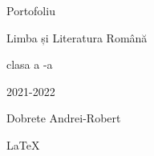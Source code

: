 \documentclass[
12pt,
a4paper
]{article}
\author{} %
\newcommand{\rom}[1]{\uppercase\expandafter{\romannumeral #1\relax}} %
\begin{document}
\begin{center}
 \vspace{9cm}
 {\LARGE Portofoliu}

 \vspace{0.5cm}
 {\Huge Limba și Literatura Română}

 \vspace{0.5cm}
 {\Large clasa a \rom{12}-a}

 \vspace{0.5cm}
 {2021-2022}

 \vspace{0.5cm}
 {\LARGE Dobrete Andrei-Robert}

 \vspace{11cm}
 \LaTeX
\end{center}
\end{document}
